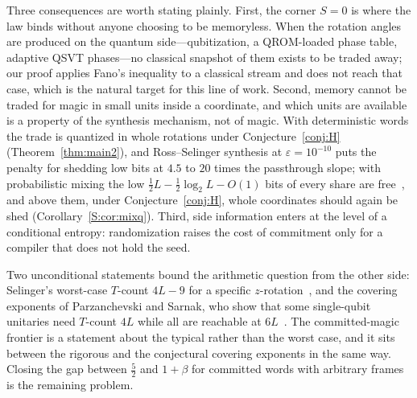 \documentclass[aps,prx,twocolumn,superscriptaddress,nofootinbib,longbibliography]{revtex4-2}
\theoremstyle{plain}
\theoremstyle{definition}
\theoremstyle{remark}
\begin{document}
Three consequences are worth stating plainly. First, the corner $S=0$ is where the law binds without anyone choosing to be memoryless. When the rotation angles are produced on the quantum side---qubitization, a QROM-loaded phase table, adaptive QSVT phases---no classical snapshot of them exists to be traded away; our proof applies Fano's inequality to a classical stream and does not reach that case, which is the natural target for this line of work. Second, memory cannot be traded for magic in small units inside a coordinate, and which units are available is a property of the synthesis mechanism, not of magic. With deterministic words the trade is quantized in whole rotations under Conjecture~\ref{conj:H} (Theorem~\ref{thm:main2}), and Ross--Selinger synthesis at $\varepsilon=10^{-10}$ puts the penalty for shedding low bits at $4.5$ to $20$ times the passthrough slope; with probabilistic mixing the low $\tfrac12L-\tfrac12\log_2L-O(1)$ bits of every share are free~\cite{Bothe}, and above them, under Conjecture~\ref{conj:H}, whole coordinates should again be shed (Corollary~\ref{S:cor:mixq}). Third, side information enters at the level of a conditional entropy: randomization raises the cost of commitment only for a compiler that does not hold the seed.

Two unconditional statements bound the arithmetic question from the other side: Selinger's worst-case $T$-count $4L-9$ for a specific $z$-rotation~\cite[Thm.~30]{Selinger15}, and the covering exponents of Parzanchevski and Sarnak, who show that some single-qubit unitaries need $T$-count $4L$ while all are reachable at $6L$~\cite{PS18}. The committed-magic frontier is a statement about the typical rather than the worst case, and it sits between the rigorous and the conjectural covering exponents in the same way. Closing the gap between $\tfrac52$ and $1+\beta$ for committed words with arbitrary frames is the remaining problem.
\end{document}
